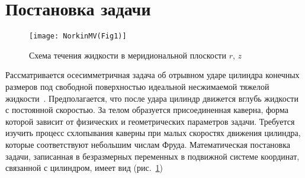 \documentclass[press]{vestnik}
\begin{document}
\section{Постановка задачи}

\begin{figure}[b]
\centering
\texttt{[image: NorkinMV(Fig1)]}
\caption{Схема течения жидкости в меридиональной плоскости $r$, $z$}
\label{fig1}
\end{figure}

Рассматривается осесимметричная задача об отрывном ударе цилиндра конечных 
размеров под свободной поверхностью идеальной несжимаемой тяжелой жидкости~\cite{B01}. Предполагается, что после удара цилиндр движется вглубь жидкости с 
постоянной скоростью. За телом образуется присоединенная каверна, форма 
которой зависит от физических и геометрических параметров задачи. Требуется 
изучить процесс схлопывания каверны при малых скоростях движения цилиндра, 
которые соответствуют небольшим числам Фруда. Математическая постановка 
задачи, записанная в безразмерных переменных в подвижной системе координат, 
связанной с цилиндром, имеет вид (рис.~\ref{fig1})
\end{document}
